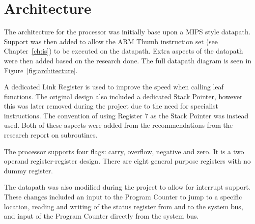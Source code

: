 

\chapter{Architecture}




The architecture for the processor was initially base upon a MIPS style datapath.
Support was then added to allow the ARM Thumb instruction set (see Chapter~\ref{ch:is}) to be executed on the datapath.
Extra aspects of the datapath were then added based on the research done. 
The full datapath diagram is seen in Figure~\ref{fig:architecture}.

A dedicated Link Register is used to improve the speed when calling leaf functions.
The original design also included a dedicated Stack Pointer, however this was later removed during the project due to the need for specialist instructions.
The convention of using Register 7 as the Stack Pointer was instead used. 
Both of these aspects were added from the recommendations from the research report on subroutines.

The processor supports four flags: carry, overflow, negative and zero. 
It is a two operand register-register design.
There are eight general purpose registers with no dummy register. 

The datapath was also modified during the project to allow for interrupt support.
These changes included an input to the Program Counter to jump to a specific location, reading and writing of the status register from and to the system bus, and input of the Program Counter directly from the system bus. 


